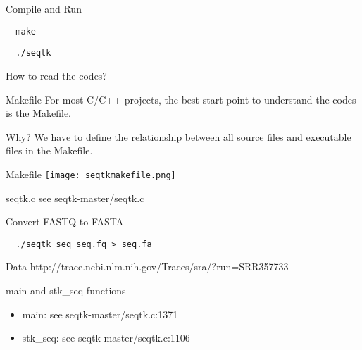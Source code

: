 \documentclass[UTF8]{beamer}
\begin{document}
\begin{frame}[t, fragile]{Compile and Run}
\begin{verbatim}
  make
\end{verbatim}

\begin{verbatim}
  ./seqtk
\end{verbatim}
\end{frame}

\begin{frame}[t]{How to read the codes?}
\begin{block}{Makefile}
  For most C/C++ projects, the best start point to understand the codes is the
  Makefile.
\end{block}

\begin{block}{Why?}
  We have to define the relationship between all source files and executable
  files in the Makefile.
\end{block}

\end{frame}

\begin{frame}[t]{Makefile}
\texttt{[image: seqtkmakefile.png]}
\end{frame}

\begin{frame}[t]{seqtk.c}
  see seqtk-master/seqtk.c
\end{frame}

\begin{frame}[t, fragile]{Convert FASTQ to FASTA}
\begin{verbatim}
  ./seqtk seq seq.fq > seq.fa
\end{verbatim}
\begin{block}{Data}
  http://trace.ncbi.nlm.nih.gov/Traces/sra/?run=SRR357733
\end{block}
\end{frame}

\begin{frame}[t]{main and stk_seq functions}
  \begin{itemize}
    \item main: see seqtk-master/seqtk.c:1371
    \item stk_seq: see seqtk-master/seqtk.c:1106
  \end{itemize}
\end{frame}
\end{document}
